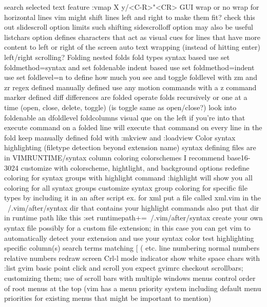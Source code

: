 \documentclass[12pt]{book}
\begin{document}
{  search selected text feature
    :vmap X y/<C-R>"<CR>
GUI
  wrap or no wrap for horizontal lines
    vim might shift lines left and right to make them fit? check this out
    slidescroll option limits such shifting
    sidescrolloff option may also be useful
    listchars option defines characters that act as visual cues for lines that have more content to left or right of the screen
    auto text wrapping (instead of hitting enter)
  left/right scrolling?
  Folding
    nested folds
    fold types
      syntax based
        use set foldmethod=syntax and set foldenable
      indent based
        use set foldmethod=indent
        use set foldlevel=n to define how much you see and toggle foldlevel with zm and zr
      regex defined
      manually defined
        use any motion commands with a z command
      marker defined
      diff differences are folded
    operate folds recursively or one at a time (open, close, delete, toggle) (is toggle same as open/close?)
    look into foldenable an dfoldlevel
    foldcolumns visual que on the left if you're into that
    execute command on a folded line will execute that command on every line in the fold
    keep manually defined fold with :mkview and :loadview
  Color
    syntax highlighting (filetype detection beyond extension name)
      syntax defining files are in VIMRUNTIME/syntax
    column coloring
    colorschemes
      I recommend base16-3024
      customize with colorscheme, hightlight, and background options
      redefine coloring for syntax groups with highlight command
      :highlight will show you all coloring for all syntax groups
      customize syntax group coloring for specific file types by including it in an after script
        ex. for xml put a file called xml.vim in the ~/.vim/after/syntax dir that contains your highlight commands
        also put that dir in runtime path like this :set runtimepath+=~/.vim/after/syntax
      create your own syntax file
        possibly for a custom file extension; in this case you can get vim to automatically detect your extension and use your syntax
    color test
  highlighting
    specific column(s)
    search terms
    matching { [ ( etc.
  line numbering
    normal numbers
    relative numbers
  redraw screen Crl-l
  mode indicator
  show white space chars with :list
  gvim
    basic point click and scroll you expect
    gvimrc
    checkout scrollbars; customizing them; use of scroll bars with multiple windows
    menus
      control order of root menus at the top (vim has a menu priority system including default menu priorities for existing menus that might be important to mention)
}}
\end{document}
